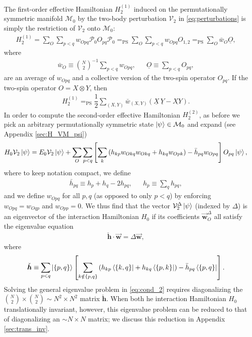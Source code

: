 \documentclass[nofootinbib,notitlepage,11pt]{revtex4-2}
\newcommand{\f}[2]{\dfrac{#1}{#2}} %
\newcommand{\p}[1]{\left(#1\right)} %
\renewcommand{\sp}[1]{\left[#1\right]} %
\renewcommand{\set}[1]{\left\{#1\right\}} %
\renewcommand{\c}{\cdot} %
\newcommand{\m}{\bm} %
\renewcommand{\v}{\vec} %
\newcommand{\1}{\mathds{1}}
\newcommand{\M}{\mathcal{M}}
\renewcommand{\P}{\mathcal{P}}
\newcommand{\V}{\mathcal{V}}
\newcommand{\EQPS}{=_{\text{PS}}}
\newcommand{\col}{\underline}
\begin{document}
The first-order effective Hamiltonian $H_2^{(1)}$ induced on the
permutationally symmetric manifold $\M_0$ by the two-body perturbation
$\V_2$ in \eqref{eq:perturbations} is simply the restriction of $\V_2$
onto $\M_0$:
\begin{align}
  H_2^{(1)} = \sum_O \sum_{p<q} w_{Opq} \P_0 O_{pq} \P_0
  \EQPS \sum_O \sum_{p<q} w_{Opq} O_{1,2}
  \EQPS \sum_O \bar w_O \col{O},
\end{align}
where
\begin{align}
  \bar w_O \equiv {N \choose 2}^{-1} \sum_{p<q} w_{Opq},
  &&
  \col{O} \equiv \sum_{p<q} O_{pq},
\end{align}
are an average of $w_{Opq}$ and a collective version of the two-spin
operator $O_{pq}$.  If the two-spin operator $O=X\otimes Y$, then
\begin{align}
  H_2^{(1)} \EQPS \f12 \sum_{\p{X,Y}} \bar w_{\p{X,Y}}
  \p{\col{X}\,\col{Y} - \col{XY}}.
\end{align}
In order to compute the second-order effective Hamiltonian
$H_2^{(2)}$, as before we pick an arbitrary permutationally symmetric
state $\ket\psi\in\M_0$ and expand (see Appendix \ref{sec:H_VM_psi})
\begin{align}
  H_0 \V_2 \ket\psi
  = E_0 \V_2 \ket\psi
  + \sum_O \sum_{p<q}
  \sp{\sum_k \p{h_{kp} w_{Okq} w_{Okq} + h_{kq} w_{Opk}}
  - \bar h_{pq} w_{Opq}}
  O_{pq} \ket\psi,
  \label{eq:H_V2_psi}
\end{align}
where to keep notation compact, we define
\begin{align}
  \bar h_{pq} \equiv h_p + h_q - 2 h_{pq},
  &&
  h_p \equiv \sum_q h_{pq},
\end{align}
and we define $w_{Opq}$ for all $p,q$ (as opposed to only $p<q$) by
enforcing $w_{Opq}=w_{Oqp}$ and $w_{Opp}=0$.  We thus find that the
vector $\V_2^\Delta\ket\psi$ (indexed by $\Delta$) is an eigenvector
of the interaction Hamiltonian $H_0$ if its coefficients
$\v{\m w}_O^\Delta$ all satisfy the eigenvalue equation
\begin{align}
  \check{\m h} \c \v{\m w} = \Delta \v{\m w},
  \label{eq:cond_2}
\end{align}
where
\begin{align}
  \check{\m h}
  \equiv \sum_{p<q} \ket{\set{p,q}} \sp{\sum_{k\notin\set{p,q}}
    \p{h_{kp} \bra{\set{k,q}} + h_{kq} \bra{\set{p,k}}}
    - \bar h_{pq} \bra{\set{p,q}}}.
  \label{eq:h_super_mat}
\end{align}
Solving the general eigenvalue problem in \eqref{eq:cond_2} requires
diagonalizing the ${N \choose 2}\times{N \choose 2}\sim N^2\times N^2$
matrix $\check{\m h}$.  When both he interaction Hamiltonian $H_0$
translationally invariant, however, this eigenvalue problem can be
reduced to that of diagonalizing an $\sim N\times N$ matrix; we
discuss this reduction in Appendix \ref{sec:trans_inv}.
\end{document}
